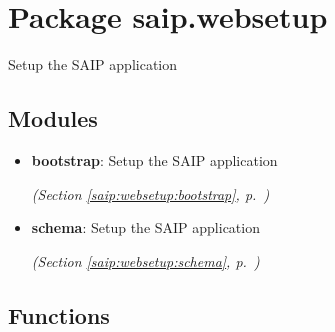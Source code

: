 %
%
%


\section{Package saip.websetup}

    \label{saip:websetup}
Setup the SAIP application



\subsection{Modules}

\begin{itemize}
\setlength{\parskip}{0ex}
\item \textbf{bootstrap}: Setup the SAIP application



  \textit{(Section \ref{saip:websetup:bootstrap}, p.~\pageref{saip:websetup:bootstrap})}

\item \textbf{schema}: Setup the SAIP application



  \textit{(Section \ref{saip:websetup:schema}, p.~\pageref{saip:websetup:schema})}

\end{itemize}



  \subsection{Functions}

